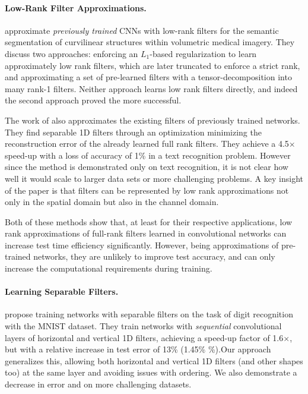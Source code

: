 \documentclass[thesis]{subfiles}
\begin{document}
    \paragraph{Low-Rank Filter Approximations.}
    \citet{conf/cvpr/RigamontiSLF13} approximate {\em previously trained} CNNs with low-rank filters for the semantic segmentation of curvilinear structures within volumetric medical imagery. They discuss two approaches: enforcing an $L_1$-based regularization to learn approximately low rank filters, which are later truncated to enforce a strict rank, and approximating a set of pre-learned filters with a tensor-decomposition into many rank-1 filters. Neither approach learns low rank filters directly, and indeed the second approach proved the more successful.
    
    The work of \citet{journals/corr/JaderbergVZ14} also approximates the existing filters of previously trained networks. They find separable 1D filters through an optimization minimizing the reconstruction error of the already learned full rank filters. They achieve a 4.5$\times$ speed-up with a loss of accuracy of 1\% in a text recognition problem. However since the method is demonstrated only on text recognition, it is not clear how well it would scale to larger data sets or more challenging problems. A key insight of the paper is that filters can be represented by low rank approximations not only in the spatial domain but also in the channel domain.
    
    Both of these methods show that, at least for their respective applications, low rank approximations of full-rank filters learned in convolutional networks can increase test time efficiency significantly. However, being approximations of pre-trained networks, they are unlikely to improve test accuracy, and can only increase the computational requirements during training.
    
    \paragraph{Learning Separable Filters.}
    \citet{mamalet2012simplifying} propose training networks with separable filters on the task of digit recognition with the MNIST dataset. They train networks with \emph{sequential} convolutional layers of horizontal and vertical 1D filters, achieving a speed-up factor of 1.6$\times$, but with a relative increase in test error of 13\% (1.45\% \%).Our approach generalizes this, allowing both horizontal and vertical 1D filters (and other shapes too) at the same layer and avoiding issues with ordering.  We also demonstrate a decrease in error and on more challenging datasets.
    
\end{document}
